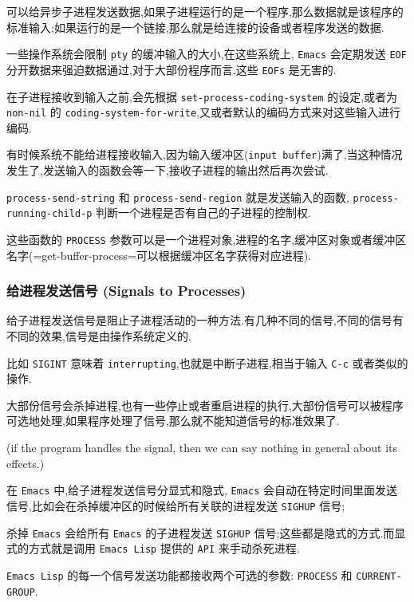 \documentclass[11pt]{article}
\begin{document}
可以给异步子进程发送数据,如果子进程运行的是一个程序,那么数据就是该程序的标准输入;如果运行的是一个链接,那么就是给连接的设备或者程序发送的数据.

一些操作系统会限制 \texttt{pty} 的缓冲输入的大小,在这些系统上, \texttt{Emacs} 会定期发送 \texttt{EOF} 分开数据来强迫数据通过,对于大部份程序而言,这些 \texttt{EOFs} 是无害的.

在子进程接收到输入之前,会先根据 \texttt{set-process-coding-system} 的设定,或者为 \texttt{non-nil} 的 \texttt{coding-system-for-write},又或者默认的编码方式来对这些输入进行编码.

有时候系统不能给进程接收输入,因为输入缓冲区(\texttt{input buffer})满了,当这种情况发生了,发送输入的函数会等一下,接收子进程的输出然后再次尝试.

\texttt{process-send-string} 和 \texttt{process-send-region} 就是发送输入的函数, \texttt{process-running-child-p} 判断一个进程是否有自己的子进程的控制权.

这些函数的 \texttt{PROCESS} 参数可以是一个进程对象,进程的名字,缓冲区对象或者缓冲区名字(=get-buffer-process=可以根据缓冲区名字获得对应进程).


\subsubsection{给进程发送信号 (Signals to Processes)}
\label{sec:orgd2b1320}

给子进程发送信号是阻止子进程活动的一种方法.有几种不同的信号,不同的信号有不同的效果,信号是由操作系统定义的.

比如 \texttt{SIGINT} 意味着 \texttt{interrupting},也就是中断子进程,相当于输入 \texttt{C-c} 或者类似的操作.

大部份信号会杀掉进程,也有一些停止或者重启进程的执行,大部份信号可以被程序可选地处理,如果程序处理了信号,那么就不能知道信号的标准效果了.

(if the program handles the signal, then we can say nothing in general about its effects.)

在 \texttt{Emacs} 中,给子进程发送信号分显式和隐式, \texttt{Emacs} 会自动在特定时间里面发送信号,比如会在杀掉缓冲区的时候给所有关联的进程发送 \texttt{SIGHUP} 信号;

杀掉 \texttt{Emacs} 会给所有 \texttt{Emacs} 的子进程发送 \texttt{SIGHUP} 信号;这些都是隐式的方式.而显式的方式就是调用 \texttt{Emacs Lisp} 提供的 \texttt{API} 来手动杀死进程.

\texttt{Emacs Lisp} 的每一个信号发送功能都接收两个可选的参数: \texttt{PROCESS} 和 \texttt{CURRENT-GROUP}.
\end{document}
